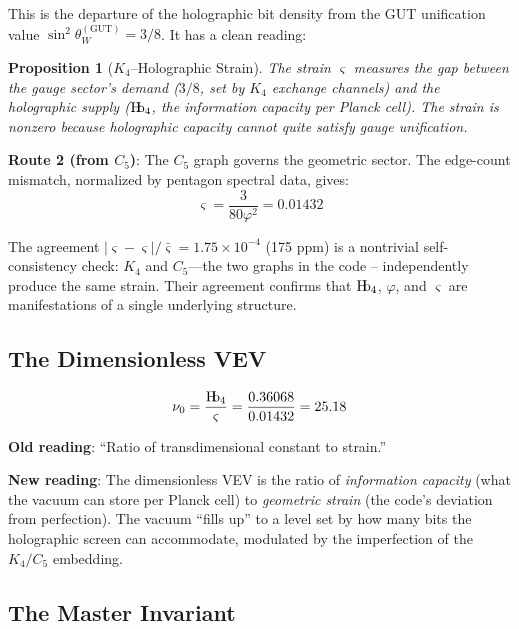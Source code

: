 \documentclass[11pt,a4paper]{article}
\theoremstyle{plain}
\newtheorem{proposition}[theorem]{Proposition}
\theoremstyle{definition}
\newcommand{\Hb}{\textnormal{H\kern-0.3em b}}
\newcommand{\Hbfour}{\Hb_4}
\newcommand{\strain}{\varsigma}
\newcommand{\nurad}{\nu_0}
\begin{document}
This is the departure of the holographic bit density from the GUT unification value $\sin^2\theta_W^{(\text{GUT})} = 3/8$. It has a clean reading:

\begin{proposition}[$K_4$--Holographic Strain]
The strain $\strain$ measures the gap between the gauge sector's demand ($3/8$, set by $K_4$ exchange channels) and the holographic supply ($\Hbfour$, the information capacity per Planck cell). The strain is nonzero because holographic capacity cannot quite satisfy gauge unification.
\end{proposition}

\textbf{Route 2 (from $C_5$)}: The $C_5$ graph governs the geometric sector. The edge-count mismatch, normalized by pentagon spectral data, gives:
\begin{equation}
\strain = \frac{3}{80\varphi^2} = 0.01432
\label{eq:delta_C5}
\end{equation}

The agreement $|\strain - \strain|/\bar\strain = 1.75 \times 10^{-4}$ (175 ppm) is a nontrivial self-consistency check: $K_4$ and $C_5$---the two graphs in the code -- independently produce the same strain. Their agreement confirms that $\Hbfour$, $\varphi$, and $\strain$ are manifestations of a single underlying structure.

\subsection{The Dimensionless VEV}

\begin{equation}
\nurad = \frac{\Hbfour}{\strain} = \frac{0.36068}{0.01432} = 25.18
\label{eq:nu0}
\end{equation}

\textbf{Old reading}: ``Ratio of transdimensional constant to strain.''

\textbf{New reading}: The dimensionless VEV is the ratio of \emph{information capacity} (what the vacuum can store per Planck cell) to \emph{geometric strain} (the code's deviation from perfection). The vacuum ``fills up'' to a level set by how many bits the holographic screen can accommodate, modulated by the imperfection of the $K_4/C_5$ embedding.

\subsection{The Master Invariant}
\end{document}
